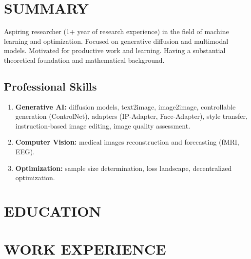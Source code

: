 \documentclass[11pt,a4paper]{moderncv}
\begin{document}
\makecvtitle

\section{SUMMARY}
Aspiring researcher (1+ year of research experience) in the field of machine learning and optimization. Focused on generative diffusion and multimodal models. Motivated for productive work and learning. Having a substantial theoretical foundation and mathematical background.

\subsection{Professional Skills}
\begin{enumerate}
    \item \textbf{Generative AI:} diffusion models, text2image, image2image, controllable generation (ControlNet), adapters (IP-Adapter, Face-Adapter), style transfer, instruction-based image editing, image quality assessment.
    \item \textbf{Computer Vision:} medical images reconstruction and forecasting (fMRI, EEG).
    \item \textbf{Optimization:} sample size determination, loss landscape, decentralized optimization.
\end{enumerate}

\section{EDUCATION}



\section{WORK EXPERIENCE}
\end{document}
